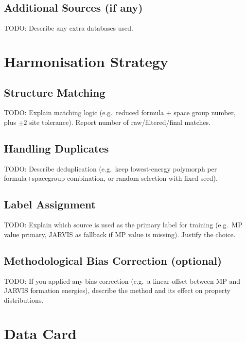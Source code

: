 \documentclass[10pt, a4paper]{article}
\begin{document}
\subsection{Additional Sources (if any)}
TODO: Describe any extra databases used.

\section{Harmonisation Strategy}

\subsection{Structure Matching}
TODO: Explain matching logic (e.g.\ reduced formula + space group number, plus
\(\pm 2\) site tolerance). Report number of raw/filtered/final matches.

\subsection{Handling Duplicates}
TODO: Describe deduplication (e.g.\ keep lowest-energy polymorph per
formula+spacegroup combination, or random selection with fixed seed).

\subsection{Label Assignment}
TODO: Explain which source is used as the primary label for training (e.g.\
MP value primary, JARVIS as fallback if MP value is missing). Justify the
choice.

\subsection{Methodological Bias Correction (optional)}
TODO: If you applied any bias correction (e.g.\ a linear offset between MP
and JARVIS formation energies), describe the method and its effect on
property distributions.

\section{Data Card}
\end{document}

